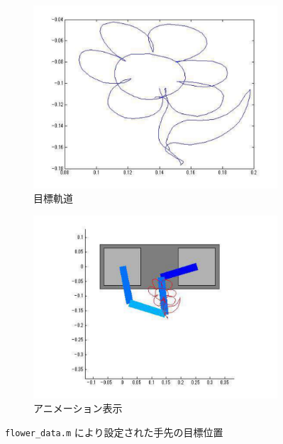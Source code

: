 \begin{figure}[H]
    \begin{subfigure}[b]{0.45\linewidth}
        \centering
        \includegraphics[width=\linewidth]{figure/mokuhyoukidou.pdf}
        \caption{目標軌道}
    \end{subfigure}
    \begin{subfigure}[b]{0.45\linewidth}
        \centering
        \includegraphics[width=\linewidth]{figure/fig4_sim_anime.pdf}
        \caption{アニメーション表示}
    \end{subfigure}
    \caption{\texttt{flower\_data.m} により設定された手先の目標位置}
    \label{fig:xy_flower}
\end{figure}

